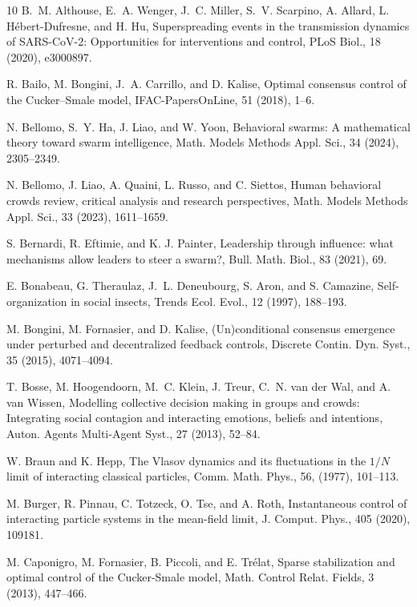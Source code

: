 \documentclass[10pt, reqno]{amsart}
\theoremstyle{definition}
\theoremstyle{remark}
\numberwithin{equation}{section}
\begin{document}
\begin{thebibliography}{10}
 B.~M. Althouse, E.~A. Wenger, J.~C. Miller, S.~V. Scarpino, A. Allard, L. Hébert-Dufresne, and H. Hu, Superspreading events in the transmission dynamics of SARS-CoV-2: Opportunities for interventions and control, PLoS Biol., 18 (2020), e3000897.

 R. Bailo, M. Bongini, J.~A. Carrillo, and D. Kalise, Optimal consensus control of the Cucker--Smale model, IFAC-PapersOnLine, 51 (2018), 1--6.

 N. Bellomo, S.~Y. Ha, J. Liao, and W. Yoon, Behavioral swarms: A mathematical theory toward swarm intelligence, Math. Models Methods Appl. Sci., 34 (2024), 2305--2349.

 N. Bellomo, J. Liao, A. Quaini, L. Russo, and C. Siettos, Human behavioral crowds review, critical analysis and research perspectives, Math. Models Methods Appl. Sci., 33 (2023), 1611--1659.

 S. Bernardi, R. Eftimie, and K. J. Painter, Leadership through influence: what mechanisms allow leaders to steer a swarm?, Bull. Math. Biol., 83 (2021), 69.

 E. Bonabeau, G. Theraulaz, J.~L. Deneubourg, S. Aron, and S. Camazine, Self-organization in social insects, Trends Ecol. Evol., 12 (1997), 188--193.

 M. Bongini, M. Fornasier, and D. Kalise, (Un)conditional consensus emergence under perturbed and decentralized feedback controls, Discrete Contin. Dyn. Syst., 35 (2015), 4071--4094.

 T. Bosse, M. Hoogendoorn, M.~C. Klein, J. Treur, C.~N. van der Wal, and A. van Wissen, Modelling collective decision making in groups and crowds: Integrating social contagion and interacting emotions, beliefs and intentions, Auton. Agents Multi-Agent Syst., 27 (2013), 52--84.

 W. Braun and K. Hepp, The Vlasov dynamics and its fluctuations in the $1/N$ limit of interacting classical particles, Comm. Math. Phys., 56, (1977), 101--113.

 M. Burger, R. Pinnau, C. Totzeck, O. Tse, and A. Roth, Instantaneous control of interacting particle systems in the mean-field limit, J. Comput. Phys., 405 (2020), 109181.

 M. Caponigro, M. Fornasier, B. Piccoli, and E. Trélat, Sparse stabilization and optimal control of the Cucker-Smale model, Math. Control Relat. Fields, 3 (2013), 447--466.


\end{thebibliography}
\end{document}
